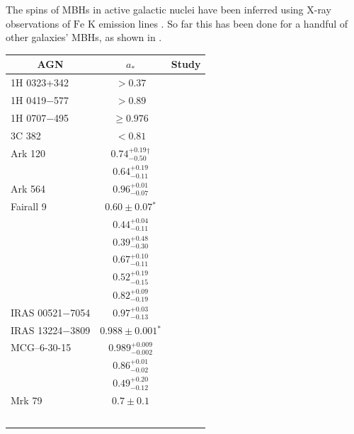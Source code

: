 The spins of MBHs in active galactic nuclei have been inferred using X-ray observations of $\mathrm{Fe}$ $\mathrm{K}$ emission lines \citep{Miller2007, McClintock2011}. So far this has been done for a handful of other galaxies' MBHs, as shown in .
\begin{table}\footnotesize
\centering
\begin{tabular}{l c l }
\toprule
\multicolumn{1}{c}{AGN} & \multicolumn{1}{c}{$a_\ast$} & \multicolumn{1}{c}{Study} \\ \midrule 
1H 0323+342 & $>0.37$ & \citet{Walton2013} \\ %
1H 0419$-$577 & $>0.89$ & \citet{Walton2013} \\ %
1H 0707$-$495 & $\geq 0.976$ & \citet{Zoghbi2010} \\ %
3C 382	& $<0.81$ & \citet{Walton2013} \\ %
Ark 120 & $0.74^{+0.19}_{-0.50}$$^\dagger$ & \citet{Nardini2011} \\ %
 & $0.64^{+0.19}_{-0.11}$ & \citet{Walton2013} \\ %
Ark 564 & $0.96^{+0.01}_{-0.07}$ & \citet{Walton2013} \\ %
Fairall 9 & $0.60 \pm 0.07$$^\ast$ & \citet{Schmoll2009} \\ %
 & $0.44^{+0.04}_{-0.11}$ & \citet{Patrick2011} \\ %
 & $0.39^{+0.48}_{-0.30}$ & \citet{Emmanoulopoulos2011} \\ %
 & $0.67^{+0.10}_{-0.11}$ & \citet{Patrick2011a} \\ %
 & $0.52^{+0.19}_{-0.15}$ & \citet{Lohfink2012} \\ %
 & $0.82^{+0.09}_{-0.19}$ & \citet{Walton2013} \\ %
IRAS 00521$-$7054 & $0.97^{+0.03}_{-0.13}$ & \citet{Tan2012} \\ %
IRAS 13224$-$3809 & $0.988 \pm 0.001$$^\ast$ & \citet{Fabian2013} \\ %
MCG--6-30-15 & $0.989^{+0.009}_{-0.002}$ & \citet{Brenneman2006} \\ %
 & $0.86^{+0.01}_{-0.02}$ & \citet{delaCallePerez2010} \\ %
 & $0.49^{+0.20}_{-0.12}$ & \citet{Patrick2011a} \\ %
Mrk 79 & $0.7 \pm 0.1$ & \citet{Gallo2011} \\ %
$$
\end{tabular}
\end{table}
